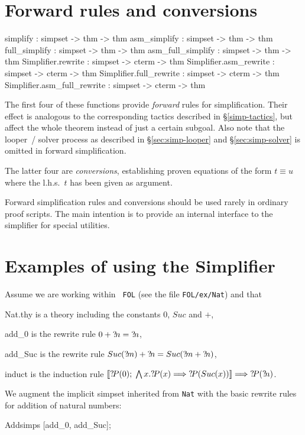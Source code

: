 \section{Forward rules and conversions}
\begin{ttbox}
simplify          : simpset -> thm -> thm
asm_simplify      : simpset -> thm -> thm
full_simplify     : simpset -> thm -> thm
asm_full_simplify : simpset -> thm -> thm\medskip
Simplifier.rewrite           : simpset -> cterm -> thm
Simplifier.asm_rewrite       : simpset -> cterm -> thm
Simplifier.full_rewrite      : simpset -> cterm -> thm
Simplifier.asm_full_rewrite  : simpset -> cterm -> thm
\end{ttbox}

The first four of these functions provide \emph{forward} rules for
simplification.  Their effect is analogous to the corresponding
tactics described in \S\ref{simp-tactics}, but affect the whole
theorem instead of just a certain subgoal.  Also note that the
looper~/ solver process as described in \S\ref{sec:simp-looper} and
\S\ref{sec:simp-solver} is omitted in forward simplification.

The latter four are \emph{conversions}, establishing proven equations
of the form $t \equiv u$ where the l.h.s.\ $t$ has been given as
argument.

\begin{warn}
  Forward simplification rules and conversions should be used rarely
  in ordinary proof scripts.  The main intention is to provide an
  internal interface to the simplifier for special utilities.
\end{warn}


\section{Examples of using the Simplifier}
 Assume we are working within {\tt
  FOL} (see the file \texttt{FOL/ex/Nat}) and that
\begin{ttdescription}
\item[Nat.thy] 
  is a theory including the constants $0$, $Suc$ and $+$,
\item[add_0]
  is the rewrite rule $0+{?\!n} = {?\!n}$,
\item[add_Suc]
  is the rewrite rule $Suc({?\!m})+{?\!n} = Suc({?\!m}+{?\!n})$,
\item[induct]
  is the induction rule $\mathopen{[\![}{?\!P}(0);\; \bigwedge x. {?\!P}(x)\Longrightarrow
    {?\!P}(Suc(x))\mathclose{]\!]} \Longrightarrow {?\!P}({?\!n})$.
\end{ttdescription}
We augment the implicit simpset inherited from \texttt{Nat} with the
basic rewrite rules for addition of natural numbers:
\begin{ttbox}
Addsimps [add_0, add_Suc];
\end{ttbox}

